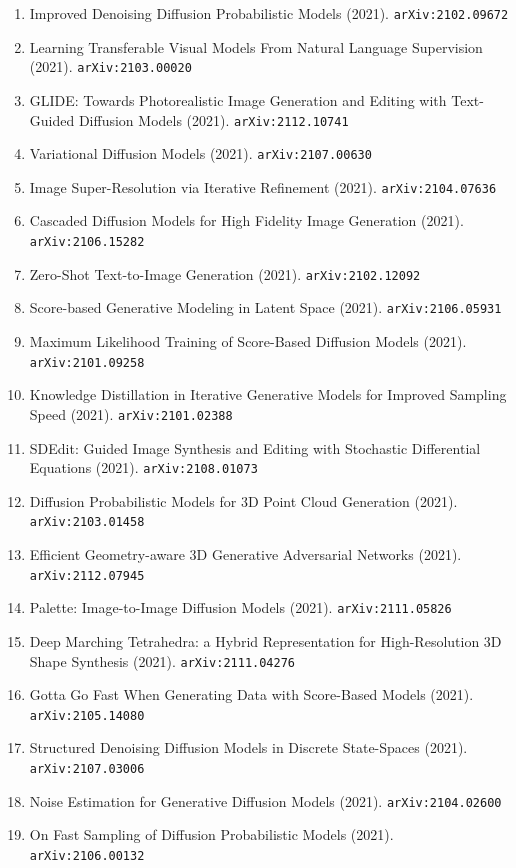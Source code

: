 \documentclass[11pt]{article}
\begin{document}
\begin{enumerate}
  \item Improved Denoising Diffusion Probabilistic Models (2021). \texttt{arXiv:2102.09672}
  \item Learning Transferable Visual Models From Natural Language Supervision (2021). \texttt{arXiv:2103.00020}
  \item GLIDE: Towards Photorealistic Image Generation and Editing with
  Text-Guided Diffusion Models (2021). \texttt{arXiv:2112.10741}
  \item Variational Diffusion Models (2021). \texttt{arXiv:2107.00630}
  \item Image Super-Resolution via Iterative Refinement (2021). \texttt{arXiv:2104.07636}
  \item Cascaded Diffusion Models for High Fidelity Image Generation (2021). \texttt{arXiv:2106.15282}
  \item Zero-Shot Text-to-Image Generation (2021). \texttt{arXiv:2102.12092}
  \item Score-based Generative Modeling in Latent Space (2021). \texttt{arXiv:2106.05931}
  \item Maximum Likelihood Training of Score-Based Diffusion Models (2021). \texttt{arXiv:2101.09258}
  \item Knowledge Distillation in Iterative Generative Models for Improved
  Sampling Speed (2021). \texttt{arXiv:2101.02388}
  \item SDEdit: Guided Image Synthesis and Editing with Stochastic Differential
  Equations (2021). \texttt{arXiv:2108.01073}
  \item Diffusion Probabilistic Models for 3D Point Cloud Generation (2021). \texttt{arXiv:2103.01458}
  \item Efficient Geometry-aware 3D Generative Adversarial Networks (2021). \texttt{arXiv:2112.07945}
  \item Palette: Image-to-Image Diffusion Models (2021). \texttt{arXiv:2111.05826}
  \item Deep Marching Tetrahedra: a Hybrid Representation for High-Resolution 3D
  Shape Synthesis (2021). \texttt{arXiv:2111.04276}
  \item Gotta Go Fast When Generating Data with Score-Based Models (2021). \texttt{arXiv:2105.14080}
  \item Structured Denoising Diffusion Models in Discrete State-Spaces (2021). \texttt{arXiv:2107.03006}
  \item Noise Estimation for Generative Diffusion Models (2021). \texttt{arXiv:2104.02600}
  \item On Fast Sampling of Diffusion Probabilistic Models (2021). \texttt{arXiv:2106.00132}

\end{enumerate}
\end{document}
